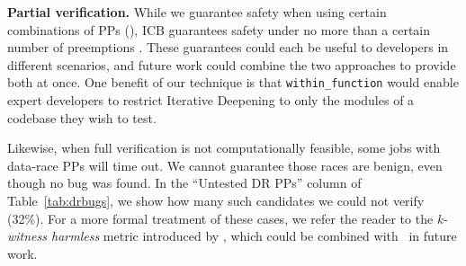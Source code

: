 


{\bf Partial verification.}
While we guarantee safety when using certain combinations of PPs (\sect{\ref{sec:eval-sssmc}}),
ICB
guarantees safety under no more than a certain number of preemptions \cite{chess-icb}.
These guarantees could each be useful to developers in different scenarios,
and future work could combine the two approaches to provide both at once.
One benefit of our technique is that {\tt within\_function} %
would enable expert developers to
restrict Iterative Deepening to only the modules of a codebase they wish to test.

Likewise, when full verification is not computationally feasible,
some jobs with data-race PPs will time out.
We cannot guarantee those races are
benign, even though no bug was found.
In the ``Untested DR PPs'' column of Table~\ref{tab:drbugs}, we show how many such candidates we could not verify (32\%).
For a more formal treatment of these cases, we refer the reader to the {\em k-witness harmless} metric introduced by \cite{portend},
which could be combined with \quicksand~in future work.
